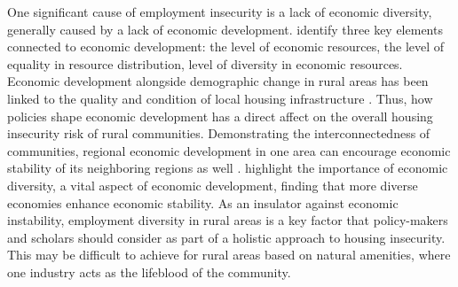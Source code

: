 One significant cause of employment insecurity is a lack of economic diversity, generally caused by a lack of economic development. \citet{sherrieb_measuring_2010} identify three key elements connected to economic development: the level of economic resources, the level of equality in resource distribution, level of diversity in economic resources. Economic development alongside demographic change in rural areas has been linked to the quality and condition of local housing infrastructure \citep{barcus_heterogeneity_2011}. Thus, how policies shape economic development has a direct affect on the overall housing insecurity risk of rural communities. Demonstrating the interconnectedness of communities, regional economic development in one area can encourage economic stability of its neighboring regions as well \citep{chen_economic_2018}. \citet{deller_spatial_2016} highlight the importance of economic diversity, a vital aspect of economic development, finding that more diverse economies enhance economic stability. As an insulator against economic instability, employment diversity in rural areas is a key factor that policy-makers and scholars should consider as part of a holistic approach to housing insecurity. This may be difficult to achieve for rural areas based on natural amenities, where one industry acts as the lifeblood of the community. 



